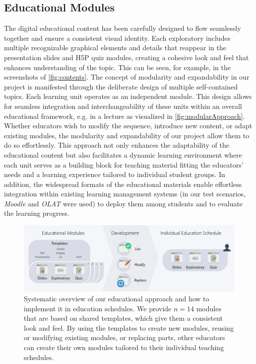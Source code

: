 \subsection{Educational Modules} %
The digital educational content has been carefully designed to flow seamlessly together and ensure a consistent visual identity. Each exploratory includes multiple recognizable graphical elements and details that reappear in the presentation slides and H5P quiz modules, creating a cohesive look and feel that enhances understanding of the topic. This can be seen, for example, in the screenshots of \autoref{fig:contents}.
The concept of modularity and expandability in our project is manifested through the deliberate design of multiple self-contained topics. Each learning unit operates as an independent module. This design allows for seamless integration and interchangeability of these units within an overall educational framework, e.g. in a lecture as visualized in \autoref{fig:modularApproach}. Whether educators wish to modify the sequence, introduce new content, or adapt existing modules, the modularity and expandability of our project allow them to do so effortlessly. This approach not only enhances the adaptability of the educational content but also facilitates a dynamic learning environment where each unit serves as a building block for teaching material fitting the educators' needs and a learning experience tailored to individual student groups. In addition, the widespread formats of the educational materials enable effortless integration within existing learning management systems (in our test scenarios, \emph{Moodle} and \emph{OLAT} were used) to deploy them among students and to evaluate the learning progress.
\begin{figure}[tb]
	\centering
	\includegraphics[width=\linewidth]{pictures/modularApproach.png}
	\captionsetup{labelfont=bf,textfont=it}
	\caption[Systematic overview of the educational approach.]{Systematic overview of our educational approach and how to implement it in education schedules. We provide $n=14$ modules that are based on shared templates, which give them a consistent look and feel. By using the templates to create new modules, reusing or modifying existing modules, or replacing parts, other educators can create their own modules tailored to their individual teaching schedules.\label{fig:modularApproach}}
\end{figure}
